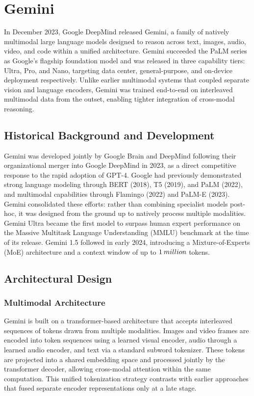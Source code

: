 \documentclass[11pt,a4paper]{report}
\begin{document}

\section{Gemini}
In December 2023, Google DeepMind released Gemini, a family of natively multimodal large language models
designed to reason across text, images, audio, video, and code within a unified architecture. Gemini succeeded
the PaLM series as Google's flagship foundation model and was released in three capability tiers: Ultra, Pro,
and Nano, targeting data center, general-purpose, and on-device deployment respectively. Unlike earlier
multimodal systems that coupled separate vision and language encoders, Gemini was trained end-to-end on
interleaved multimodal data from the outset, enabling tighter integration of cross-modal reasoning.

\subsection{Historical Background and Development}
Gemini was developed jointly by Google Brain and DeepMind following their organizational merger into Google
DeepMind in 2023, as a direct competitive response to the rapid adoption of GPT-4. Google had previously
demonstrated strong language modeling through BERT (2018), T5 (2019), and PaLM (2022), and multimodal
capabilities through Flamingo (2022) and PaLM-E (2023). Gemini consolidated these efforts: rather than
combining specialist models post-hoc, it was designed from the ground up to natively process multiple modalities.
Gemini Ultra became the first model to surpass human expert performance on the Massive Multitask Language
Understanding (MMLU) benchmark at the time of its release. Gemini 1.5 followed in early 2024, introducing a
Mixture-of-Experts (MoE) architecture and a context window of up to $1 \hspace{0.2em} million$ tokens.

\subsection{Architectural Design}

\subsubsection{Multimodal Architecture}
Gemini is built on a transformer-based architecture that accepts interleaved sequences of tokens drawn from
multiple modalities. Images and video frames are encoded into token sequences using a learned visual encoder,
audio through a learned audio encoder, and text via a standard subword tokenizer. These tokens are projected
into a shared embedding space and processed jointly by the transformer decoder, allowing cross-modal attention
within the same computation. This unified tokenization strategy contrasts with earlier approaches that fused
separate encoder representations only at a late stage.
\end{document}

